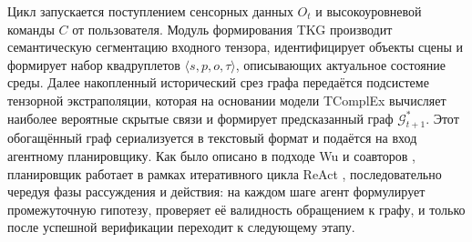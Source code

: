 




Цикл запускается поступлением сенсорных данных $\displaystyle O_t$ и высокоуровневой команды $\displaystyle C$ от пользователя. Модуль формирования TKG производит семантическую сегментацию входного тензора, идентифицирует объекты сцены и формирует набор квадруплетов $\displaystyle \langle s, p, o, \tau \rangle$, описывающих актуальное состояние среды. Далее накопленный исторический срез графа передаётся подсистеме тензорной экстраполяции, которая на основании модели TComplEx вычисляет наиболее вероятные скрытые связи и формирует предсказанный граф $\displaystyle \mathcal{G}_{t+1}^*$. Этот обогащённый граф сериализуется в текстовый формат и подаётся на вход агентному планировщику. Как было описано в подходе Wu и соавторов \cite{ref19}, планировщик работает в рамках итеративного цикла ReAct \cite{ref83}, последовательно чередуя фазы рассуждения и действия: на каждом шаге агент формулирует промежуточную гипотезу, проверяет её валидность обращением к графу, и только после успешной верификации переходит к следующему этапу.

